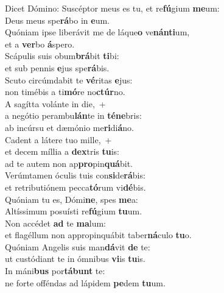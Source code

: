 \evenverse Dicet Dómino: Suscéptor meus es tu, et re\textbf{fú}gium \textbf{me}um:~\*\\
\evenverse Deus meus spe\textbf{rá}bo in \textbf{e}um.\\
\oddverse Quóniam ipse liberávit me de láque\textbf{o} ve\textbf{nán}\textbf{ti}um,~\*\\
\oddverse et a \textbf{ver}bo \textbf{á}spero.\\
\evenverse Scápulis suis obum\textbf{brá}bit \textbf{ti}bi:~\*\\
\evenverse et sub pennis \textbf{e}jus spe\textbf{rá}bis.\\
\oddverse Scuto circúmdabit te \textbf{vé}ritas \textbf{e}jus:~\*\\
\oddverse non timébis a ti\textbf{mó}re no\textbf{ctúr}no.\\
\evenverse A sagítta volánte in die,~+\\
\evenverse  a negótio perambu\textbf{lán}te in \textbf{té}\textbf{ne}bris:~\*\\
\evenverse ab incúrsu et dæmónio me\textbf{ri}di\textbf{á}no.\\
\oddverse Cadent a látere tuo mille,~+\\
\oddverse  et decem míllia a \textbf{dex}tris \textbf{tu}is:~\*\\
\oddverse ad te autem non ap\textbf{pro}pin\textbf{quá}bit.\\
\evenverse Verúmtamen óculis tuis con\textbf{si}de\textbf{rá}bis:~\*\\
\evenverse et retributiónem pecca\textbf{tó}rum vi\textbf{dé}bis.\\
\oddverse Quóniam tu es, Dómi\textbf{ne}, spes \textbf{me}a:~\*\\
\oddverse Altíssimum posuísti re\textbf{fú}gium \textbf{tu}um.\\
\evenverse Non accédet \textbf{ad} te \textbf{ma}lum:~\*\\
\evenverse et flagéllum non appropinquábit taber\textbf{ná}culo \textbf{tu}o.\\
\oddverse Quóniam Angelis suis man\textbf{dá}vit \textbf{de} te:~\*\\
\oddverse ut custódiant te in ómnibus \textbf{vi}is \textbf{tu}is.\\
\evenverse In máni\textbf{bus} por\textbf{tá}\textbf{bunt} te:~\*\\
\evenverse ne forte offéndas ad lápidem \textbf{pe}dem \textbf{tu}um.\\
